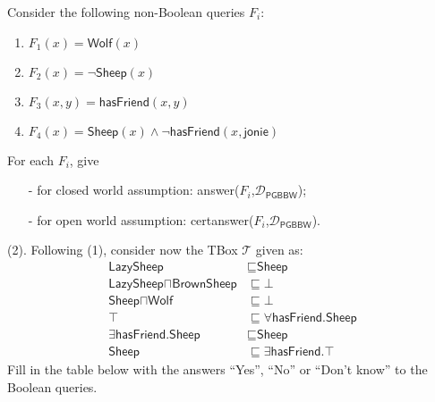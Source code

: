 \documentclass{article}
\begin{document}
    
    Consider the following non-Boolean queries $F_{i}$:
    
    \begin{enumerate}
        \item $F_{1}(x)=\textsf{Wolf}(x)$ 
        \item $F_{2}(x)=\neg\textsf{Sheep}(x)$ 
        \item $F_{3}(x,y)=\textsf{hasFriend}(x,y)$ 
        \item $F_{4}(x)=\textsf{Sheep}(x)\wedge\neg\textsf{hasFriend}(x,\textsf{jonie})$
    \end{enumerate}
    
    For each $F_{i}$, give
    
    \begin{itemize}
        \item[-] for closed world assumption: \textsf{answer($F_{i}$,$\mathcal{D}_{\textsf{PGBBW}}$)};
        \item[-] for open world assumption: \textsf{certanswer($F_{i}$,$\mathcal{D}_{\textsf{PGBBW}}$)}. 
    \end{itemize}
    
    
    (2). Following (1), consider now the TBox $\mathcal{T}$ given as:
    \begin{align*}
        \textsf{LazySheep} & \sqsubseteq \textsf{Sheep}\\
        \textsf{LazySheep}\sqcap\textsf{BrownSheep} & \sqsubseteq\bot\\
        \textsf{Sheep}\sqcap\textsf{Wolf} & \sqsubseteq\bot\\
        \top & \sqsubseteq\forall\textsf{hasFriend.Sheep}\\
        \exists\textsf{hasFriend.Sheep} & \sqsubseteq\textsf{Sheep}\\
        \textsf{Sheep} & \sqsubseteq\exists\textsf{hasFriend.}\top
    \end{align*}
    Fill in the table below with the answers ``Yes'', ``No'' or ``Don't know'' to the Boolean queries.
    
\end{document}
